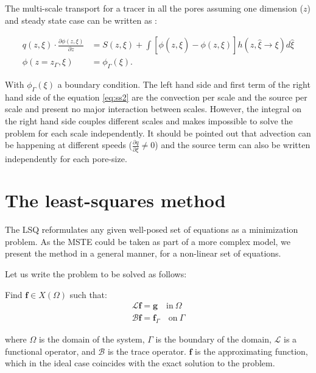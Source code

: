 \documentclass{CFD2011}
\newcommand{\TODO}[1]{\textcolor{blue}{TODO: #1} \\}
\begin{document}
The multi-scale transport for a tracer in all the pores assuming one dimension ($z$) and steady state case can be written as \citep{DupuySchwarz}:

\begin{align}
\nonumber q(z, \xi) \cdot \frac{\partial \phi(z, \xi)}{\partial z}  &= S(z, \xi)   +
 \int [\phi(z, \hat \xi) - \phi(z, \xi)] h(z, \hat \xi \rightarrow \xi) d\hat \xi\\
\phi(z=z_{\Gamma},\xi)&=\phi_{\Gamma}(\xi).
\label{eq:ss2}
\end{align}

With $\phi_{\Gamma}(\xi)$ a boundary condition.
The left hand side and first term of the right hand side of the equation \ref{eq:ss2} are the convection per scale and the source per scale and present no major interaction between scales. However, the integral on the right hand side couples different scales and makes impossible to solve the problem for each scale independently. It should be pointed out that advection can be happening at different speeds ($\tfrac{\partial q}{\partial \xi} \neq 0$) and the source term can also be written independently for each pore-size.


\section{The least-squares method}
\label{sec:LSQ}
The LSQ reformulates any given well-posed set of equations as a minimization problem. As the MSTE could be taken as part of a more complex model, we present the method in a general manner, for a non-linear set of equations. 

Let us write the problem to be solved as follows: 

Find $\mathbf{f}\in X(\Omega)$ such that:
\begin{eqnarray}
\mathcal{L} \mathbf{f} = \mathbf{g} \quad \mbox{in} \ \Omega \label{eq:Problem} \\
\mathcal{B} \mathbf{f} = \mathbf{f}_{\Gamma} \quad \mbox{on} \ \Gamma \label{eq:Boundary}
\end{eqnarray}

\noindent where $\Omega$ is the domain of the system, $\Gamma$ is the boundary of the domain, $\mathcal{L}$ is a functional operator, and $\mathcal{B}$ is the trace operator. $\mathbf{f}$ is the approximating function, which in the ideal case coincides with the exact solution to the problem.
\end{document}
